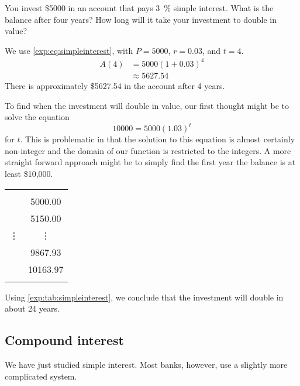 \begin{pccexample}
	You invest \$5000 in an account that pays \SI{3}{\percent} simple interest. What is 
	the balance after four years? How long will it take your investment to double in value?
										
	\begin{pccsolution}
		We use \cref{exp:eq:simpleinterest}, with $P=5000$, $r=0.03$, and $t=4$.
		\begin{align*}
			A(4) & =  5000(1+0.03)^4 \\
			     & \approx  5627.54  
		\end{align*}
		There is approximately \$5627.54 in the account after 4 years.
																	
		To find when the investment will double in value, our first thought might 
		be to solve the equation
		\[
			10000 = 5000(1.03)^t
		\]
		for $t$. This is problematic in that the solution to this equation is almost 
		certainly non-integer and the domain of our function is restricted to the 
		integers. A more straight forward approach might be to simply find the first 
		year the balance is at least \$10,000.
		\begin{margintable}
			\centering
			\begin{tabular}{S[table-format=2.0]S[table-format=5.2]}
				\beforeheading
				 &  \\ 
				             & 5000.00          \\             & 5150.00          \\\normalline
				\mbox{\vdots} & \mbox{\vdots}    \\            & 9867.93          \\            & 10163.97         \\\lastline
			\end{tabular}
			\label{exp:tab:simpleinterest}
		\end{margintable}
																	
		Using \cref{exp:tab:simpleinterest}, we conclude that the 
		investment will double in about 24 years. 
	\end{pccsolution}
\end{pccexample}
			
			
\subsection*{Compound interest}
We have just studied simple interest. Most banks, however, 
use a slightly more complicated system.
			
